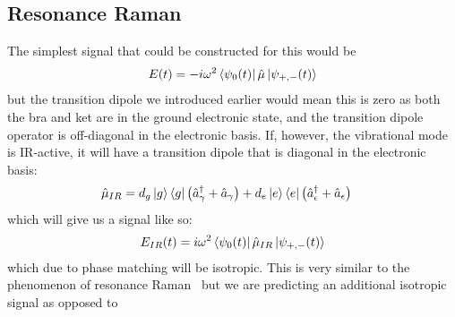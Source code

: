 \subsection{ Resonance Raman }
The simplest signal that could be constructed for this would be
\begin{align*}
	E(t) = -i \omega^2 \bra{\psi_0 (t)} \hat{\mu} \ket{\psi_{+,-} (t) }
\end{align*}
but the transition dipole we introduced earlier would mean this is zero as both the bra and ket are in the ground electronic state, and the transition dipole operator is off-diagonal in the electronic basis.  If, however, the vibrational mode is IR-active, it will have a transition dipole that is diagonal in the electronic basis:
\begin{align}
	\hat{\mu}_{IR} &=  d_g\ket{g}\bra{g} \left( \hat{a}_{\gamma}^{\dagger} + \hat{a}_{\gamma} \right) + d_e \ket{e}\bra{e}\left( \hat{a}_{\epsilon}^{\dagger} + \hat{a}_{\epsilon} \right)
\end{align}
which will give us a signal like so:
\begin{align}
	E_{IR}(t) = i\omega^2  \bra{\psi_0(t)} \hat{\mu}_{IR} \ket{\psi_{+, -} (t) }
\end{align}
which due to phase matching will be isotropic.  This is very similar to the phenomenon of resonance Raman~\cite{ResonanceRaman} but we are predicting an additional isotropic signal as opposed to

